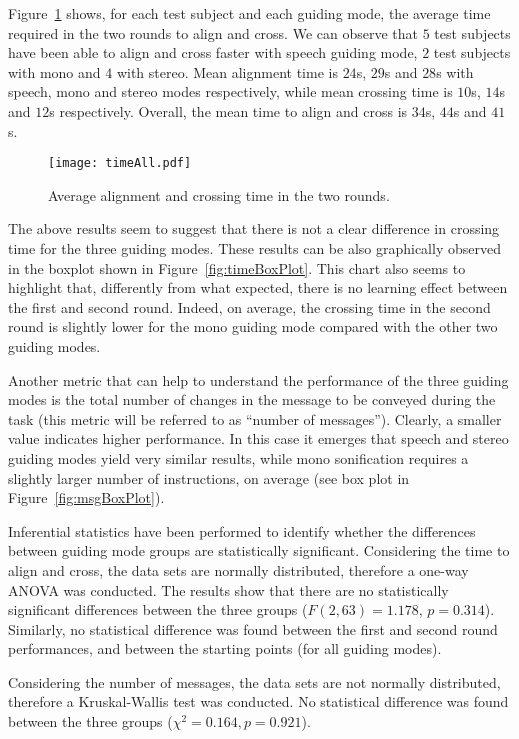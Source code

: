 \documentclass{article}
\begin{document}
Figure~\ref{fig:timeAll} shows, for each test subject and each guiding mode, the average time required in the two rounds to align and cross.
We can observe that $5$ test subjects have been able to align and cross faster with speech guiding mode, $2$ test subjects with mono and $4$ with stereo.
Mean alignment time is $24$s, $29$s and $28$s with speech, mono and stereo modes respectively, while mean crossing time is $10$s, $14$s and $12$s respectively.
Overall, the mean time to align and cross is $34$s, $44$s and $41$s.

\begin{figure}[t!]
	\centering
		\texttt{[image: timeAll.pdf]}
	\caption[]{Average alignment and crossing time in the two rounds.}
	\label{fig:timeAll}
\end{figure}

The above results seem to suggest that there is not a clear difference in crossing time for the three guiding modes. These results can be also graphically observed in the boxplot shown in Figure~\ref{fig:timeBoxPlot}.
This chart also seems to highlight that, differently from what expected, there is no learning effect between the first and second round. Indeed, on average, the crossing time in the second round is slightly lower for the mono guiding mode compared with the other two guiding modes.

Another metric that can help to understand the performance of the three guiding modes is the total number of changes in the message to be conveyed during the task (this metric will be referred to as ``number of messages''). Clearly, a smaller value indicates higher performance.
In this case it emerges that speech and stereo guiding modes yield very similar results, while mono sonification requires a slightly larger number of instructions, on average (see box plot in Figure~\ref{fig:msgBoxPlot}).

Inferential statistics have been performed to identify whether the differences between guiding mode groups are statistically significant.
Considering the time to align and cross, the data sets are normally distributed, therefore a one-way ANOVA was conducted. The results show that there are no statistically significant differences between the three groups ($F(2,63)=1.178$, $p=0.314$).
Similarly, no statistical difference was found between the first and second round performances, and between the starting points (for all guiding modes).

Considering the number of messages, the data sets are not normally distributed, therefore a Kruskal-Wallis test was conducted. No statistical difference was found between the three groups ($\chi^2 = 0.164, p = 0.921$).
\end{document}
